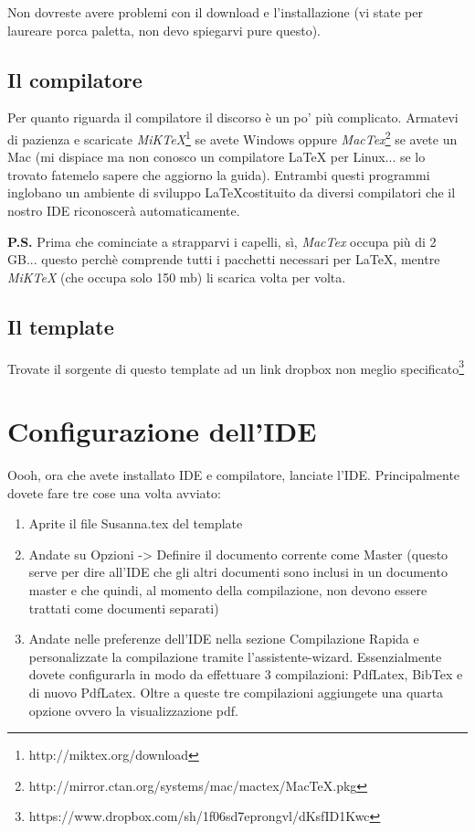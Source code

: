 Non dovreste avere problemi con il download e l'installazione (vi state per laureare porca paletta, non devo spiegarvi pure questo).


\subsection{Il compilatore}
\label{sub:compilatore}

Per quanto riguarda il compilatore il discorso è un po' più complicato. Armatevi di pazienza e scaricate \emph{MiKTeX}\footnote{http://miktex.org/download} se avete Windows oppure \emph{MacTex}\footnote{http://mirror.ctan.org/systems/mac/mactex/MacTeX.pkg} se avete un Mac (mi dispiace ma non conosco un compilatore LaTeX per Linux... se lo trovato fatemelo sapere che aggiorno la guida). Entrambi questi programmi inglobano un ambiente di sviluppo \LaTeX costituito da diversi compilatori che il nostro IDE riconoscerà automaticamente.

\textbf{P.S.} Prima che cominciate a strapparvi i capelli, sì, \emph{MacTex} occupa più di 2 GB... questo perchè comprende tutti i pacchetti necessari per \LaTeX, mentre \emph{MiKTeX} (che occupa solo 150 mb) li scarica volta per volta.


\subsection{Il template}
\label{sub:template}

Trovate il sorgente di questo template ad un link dropbox non meglio specificato\footnote{https://www.dropbox.com/sh/1f06sd7eprongvl/dKsfID1Kwc}


\section{Configurazione dell'IDE}
\label{sec:configurazioneIDE}

Oooh, ora che avete installato IDE e compilatore, lanciate l'IDE. Principalmente dovete fare tre cose una volta avviato:

\begin{enumerate}
\item Aprite il file Susanna.tex del template
\item Andate su Opzioni -> Definire il documento corrente come Master (questo serve per dire all'IDE che gli altri documenti sono inclusi in un documento master e che quindi, al momento della compilazione, non devono essere trattati come documenti separati)
\item Andate nelle preferenze dell'IDE nella sezione Compilazione Rapida e personalizzate la compilazione tramite l'assistente-wizard. Essenzialmente dovete configurarla in modo da effettuare 3 compilazioni: PdfLatex, BibTex e di nuovo PdfLatex. Oltre a queste tre compilazioni aggiungete una quarta opzione ovvero la visualizzazione pdf.
\end{enumerate}

